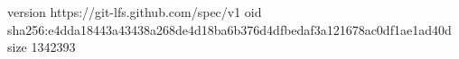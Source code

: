 version https://git-lfs.github.com/spec/v1
oid sha256:e4dda18443a43438a268de4d18ba6b376d4dfbedaf3a121678ac0df1ae1ad40d
size 1342393
